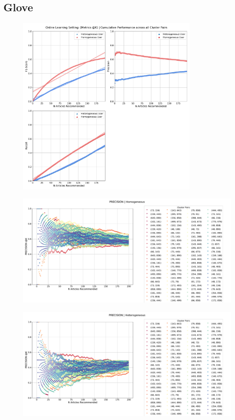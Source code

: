 \documentclass[a4paper,fontsize=8.0pt]{scrartcl}
\begin{document}
\subsection{Glove}
\vspace{1ex}
\begin{figure}[H]
 \includegraphics[width=0.8\textwidth]{Graphs/GLOVE/user_interaction_vs_model_performance_cumu.pdf}
\end{figure}
\vspace{-4ex}
\begin{figure}[H]
 \includegraphics[width=1.0\textwidth]{Graphs/GLOVE/user_interaction_vs_model_performance_precision_all_cps_Homogeneous.pdf}
\end{figure}
\begin{figure}[H]
 \includegraphics[width=1.0\textwidth]{Graphs/GLOVE/user_interaction_vs_model_performance_precision_all_cps_Heterogeneous.pdf}
\end{figure}
\end{document}

